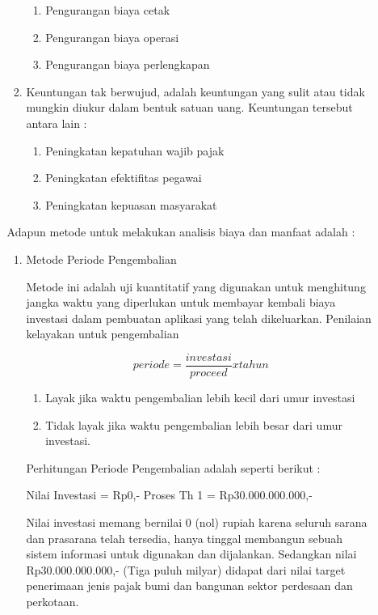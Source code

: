 \documentclass[pdftex,12pt, oneside]{article}
\begin{document}
\begin{enumerate}
\begin{enumerate}
\begin{enumerate}
	\begin{enumerate}
		\item Pengurangan biaya cetak
		\item Pengurangan biaya operasi
		\item Pengurangan biaya perlengkapan
	\end{enumerate}
	
	\item Keuntungan tak berwujud, adalah keuntungan yang sulit atau tidak mungkin diukur dalam bentuk satuan uang. Keuntungan tersebut antara lain :
	
	\begin{enumerate}
		\item Peningkatan kepatuhan wajib pajak
		\item Peningkatan efektifitas pegawai
		\item Peningkatan kepuasan masyarakat
	\end{enumerate}
\end{enumerate}	

Adapun metode untuk melakukan analisis biaya dan manfaat adalah :

\begin{enumerate}
	\item Metode Periode Pengembalian

Metode ini adalah uji kuantitatif yang digunakan untuk menghitung jangka waktu yang diperlukan untuk membayar kembali biaya investasi dalam pembuatan aplikasi yang telah dikeluarkan. Penilaian kelayakan untuk pengembalian 

\[periode = \frac{investasi}{proceed} x tahun \]

\begin{enumerate}
	\item Layak jika waktu pengembalian lebih kecil dari umur investasi
	\item Tidak layak jika waktu pengembalian lebih besar dari umur investasi.
\end{enumerate}

Perhitungan Periode Pengembalian adalah seperti berikut :

Nilai Investasi = Rp0,-
Proses Th 1 = Rp30.000.000.000,-

Nilai investasi memang bernilai 0 (nol) rupiah karena seluruh sarana dan prasarana telah tersedia, hanya tinggal membangun sebuah sistem informasi untuk digunakan dan dijalankan. Sedangkan nilai Rp30.000.000.000,- (Tiga puluh milyar) didapat dari nilai target penerimaan jenis pajak bumi dan bangunan sektor perdesaan dan perkotaan.


\end{enumerate}
\end{enumerate}
\end{enumerate}
\end{document}
